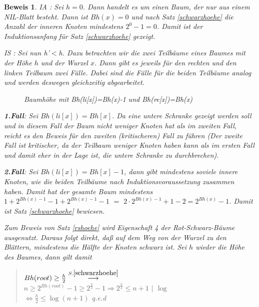 \documentclass[ngerman,draft,parskip=half*,twoside]{scrreprt}
\theoremstyle{break}
\newtheorem{beweis}{Beweis}
\begin{document}
\begin{beweis} 
 IA : Sei $h=0$. Dann handelt es um einen Baum, der nur aus einem NIL-Blatt besteht. Dann ist $Bh(x)=0$ und nach Satz \ref{schwarzhoehe} 
 die Anzahl der inneren Knoten mindestens $2^0-1=0$. Damit ist der Induktionsanfang für Satz \ref{schwarzhoehe} gezeigt. 
 \medskip
 
 \noindent IS : Sei nun h'$<$h. Dazu betrachten wir die zwei Teilbäume eines Baumes mit der Höhe $h$ und der Wurzel $x$.
Dann gibt es jeweils für den rechten und den linken Teilbaum zwei Fälle. Dabei sind die Fälle für die beiden Teilbäume analog und
 werden deswegen gleichzeitig abgearbeitet.

    \begin{figure}[H]
    \centering
    \caption{Baumhöhe mit Bh(li[x])=Bh(x)-1 und Bh(re[x])=Bh(x)}
    \label{241103d}
 \end{figure} 
 
    \textbf{1.Fall}:  Sei $Bh(li[x]) = Bh[x]$. Da eine untere Schranke gezeigt werden soll und in diesem Fall der Baum nicht weniger 
    Knoten
    hat als im zweiten Fall, reicht es den Beweis für den zweiten (kritischeren) Fall zu führen (Der zweite Fall ist kritischer, da
    der Teilbaum weniger Knoten haben kann als im ersten Fall und damit eher in der Lage ist, die untere Schranke zu durchbrechen).
     
    \textbf{2.Fall}:  Sei $Bh(li[x]) = Bh[x]-1$, dann gibt mindestens soviele innere Knoten, wie die beiden
    Teilbäume nach Induktionsvoraussetzung zusammen haben. Damit hat der gesamte Baum mindestens   
    $1+2^{Bh(x)-1}-1+2^{Bh(x)-1}-1$  $=$ $2 \cdot 2^{Bh(x)-1}+1-2 = 2^{Bh(x)}-1$. Damit ist Satz \ref{schwarzhoehe} bewiesen. 
    
Zum Beweis von Satz \ref{rshoehe} wird Eigenschaft 4 der Rot-Schwarz-Bäume ausgenutzt. Daraus folgt direkt, daß auf dem Weg von der Wurzel zu den Blättern,
mindestens die Hälfte der Knoten schwarz ist. Sei $h$ wieder die Höhe des Baumes, dann gilt damit 

\begin{quote}       
        $Bh(root) \geq \frac{h}{2}\stackrel{\scriptstyle{S.}  \ref{schwarzhoehe}}{\longrightarrow}$\\
        $n \geq 2^{Bh(root)}-1 \geq 2^{\frac{h}{2}}-1 \Rightarrow 2^{\frac{h}{2}}\leq n+1$ \hspace{2cm}$|$ $\log$\\
        $\Leftrightarrow \frac{h}{2}\leq \log(n+1)$  \hfill q.e.d  
\end{quote}
\end{beweis} 
\end{document}
